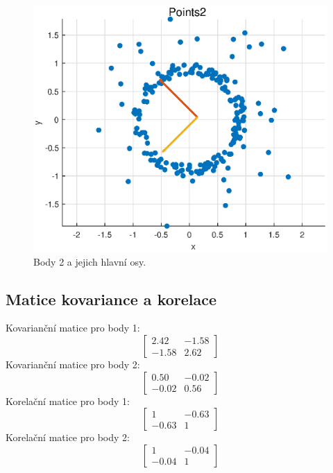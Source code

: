 \begin{figure}[H]
    \centering
    \includegraphics[width=\textwidth]{images/points2.eps}
    \caption{Body 2 a jejich hlavní osy.}
\end{figure}

\subsection{Matice kovariance a korelace}

Kovarianční matice pro body 1:\[\begin{bmatrix}
2.42 & -1.58 \\
-1.58 & 2.62
\end{bmatrix}
\]
Kovarianční matice pro body 2:\[\begin{bmatrix}
0.50 & -0.02 \\
-0.02 & 0.56
\end{bmatrix}
\]
Korelační matice pro body 1:
\[
\begin{bmatrix}
1 & -0.63 \\
-0.63 & 1
\end{bmatrix}
\]
Korelační matice pro body 2:
\[
\begin{bmatrix}
1 & -0.04 \\
-0.04 & 1
\end{bmatrix}
\]
